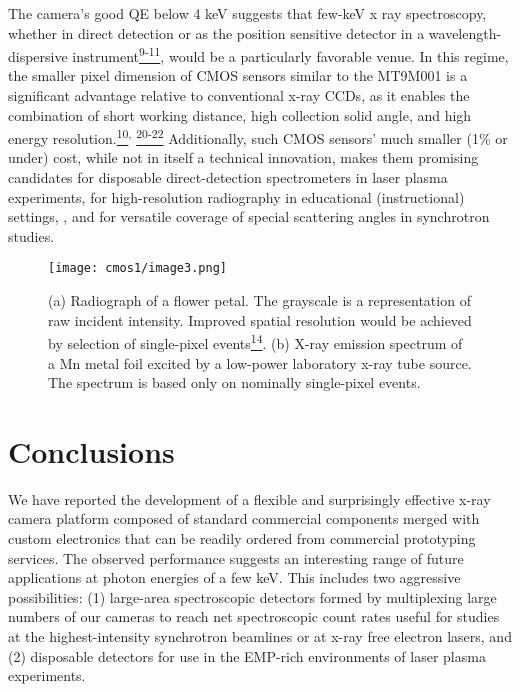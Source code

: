 The camera's good QE below 4 keV suggests that few-keV x ray
spectroscopy, whether in direct detection or as the position sensitive
detector in a wavelength-dispersive
instrument\hyperref[ux5fENREFux5f9]{\textsuperscript{9-11}}, would be a
particularly favorable venue. In this regime, the smaller pixel
dimension of CMOS sensors similar to the MT9M001 is a significant
advantage relative to conventional x-ray CCDs, as it enables the
combination of short working distance, high collection solid angle, and
high energy
resolution.\hyperref[ux5fENREFux5f14]{}\hyperref[ux5fENREFux5f10]{\textsuperscript{10}}\textsuperscript{,}
\hyperref[ux5fENREFux5f20]{\textsuperscript{20-22}} Additionally, such
CMOS sensors' much smaller (1\% or under) cost, while not in itself a
technical innovation, makes them promising candidates for disposable
direct-detection spectrometers in laser plasma experiments, for
high-resolution radiography in educational (instructional) settings, ,
and for versatile coverage of special scattering angles in synchrotron
studies.

\begin{figure}[h] \label{cm1image3}
\caption{ (a) Radiograph of a flower petal. The grayscale is a
representation of raw incident intensity. Improved spatial resolution
would be achieved by selection of single-pixel
events\hyperref[ux5fENREFux5f14]{\textsuperscript{14}}. (b) X-ray
emission spectrum of a Mn metal foil excited by a low-power laboratory
x-ray tube source. The spectrum is based only on nominally single-pixel
events.}
\centering
\texttt{[image: cmos1/image3.png]}
\end{figure}

\FloatBarrier

\section{Conclusions}
We have reported the development of a flexible and
surprisingly effective x-ray camera platform composed of standard
commercial components merged with custom electronics that can be readily
ordered from commercial prototyping services. The observed performance
suggests an interesting range of future applications at photon energies
of a few keV. This includes two aggressive possibilities: (1) large-area
spectroscopic detectors formed by multiplexing large numbers of our
cameras to reach net spectroscopic count rates useful for studies at the
highest-intensity synchrotron beamlines or at x-ray free electron
lasers, and (2) disposable detectors for use in the EMP-rich
environments of laser plasma experiments.

